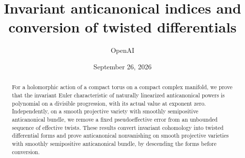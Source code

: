 \documentclass[11pt]{article}
\title{Invariant anticanonical indices and conversion of twisted differentials}
\author{OpenAI}
\date{September 26, 2026}
\numberwithin{equation}{section}
\theoremstyle{definition}
\begin{document}
\maketitle
\begin{abstract}
For a holomorphic action of a compact torus on a compact complex manifold,
we prove that the invariant Euler characteristic of naturally linearized
anticanonical powers is polynomial on a divisible progression, with its
actual value at exponent zero. Independently, on a smooth projective
variety with smoothly semipositive anticanonical bundle, we remove a fixed
pseudoeffective error from an unbounded sequence of effective twists.
These results convert invariant cohomology into twisted differential
forms and prove anticanonical nonvanishing on smooth projective varieties
with smoothly semipositive anticanonical bundle, by descending the forms
before conversion.
\end{abstract}





\begingroup
\small


\endgroup
\end{document}
